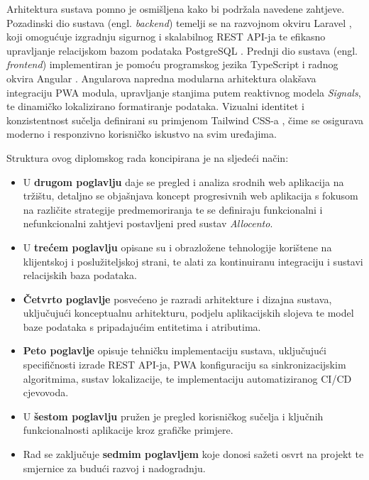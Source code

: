 \documentclass[a4paper,12pt,oneside]{article}
\begin{document}
	Arhitektura sustava pomno je osmišljena kako bi podržala navedene zahtjeve. Pozadinski dio sustava (engl. \textit{backend}) temelji se na razvojnom okviru Laravel \cite{w_laravel,b_php_mvc}, koji omogućuje izgradnju sigurnog i skalabilnog REST API-ja te efikasno upravljanje relacijskom bazom podataka PostgreSQL \cite{w_postgresql}. Prednji dio sustava (engl. \textit{frontend}) implementiran je pomoću programskog jezika TypeScript \cite{w_typescript} i radnog okvira Angular \cite{w_angular,b_html5}. Angularova napredna modularna arhitektura olakšava integraciju PWA modula, upravljanje stanjima putem reaktivnog modela \textit{Signals}, te dinamičko lokalizirano formatiranje podataka. Vizualni identitet i konzistentnost sučelja definirani su primjenom Tailwind CSS-a \cite{w_tailwind}, čime se osigurava moderno i responzivno korisničko iskustvo na svim uređajima.

	Struktura ovog diplomskog rada koncipirana je na sljedeći način:
	
	\begin{itemize}
		\item U \textbf{drugom poglavlju} daje se pregled i analiza srodnih web aplikacija na tržištu, detaljno se objašnjava koncept progresivnih web aplikacija s fokusom na različite strategije predmemoriranja te se definiraju funkcionalni i nefunkcionalni zahtjevi postavljeni pred sustav \textit{Allocento}.
		
		\item U \textbf{trećem poglavlju} opisane su i obrazložene tehnologije korištene na klijentskoj i poslužiteljskoj strani, te alati za kontinuiranu integraciju i sustavi relacijskih baza podataka.
		
		\item \textbf{Četvrto poglavlje} posvećeno je razradi arhitekture i dizajna sustava, uključujući konceptualnu arhitekturu, podjelu aplikacijskih slojeva te model baze podataka s pripadajućim entitetima i atributima.
		
		\item \textbf{Peto poglavlje} opisuje tehničku implementaciju sustava, uključujući specifičnosti izrade REST API-ja, PWA konfiguraciju sa sinkronizacijskim algoritmima, sustav lokalizacije, te implementaciju automatiziranog CI/CD cjevovoda.
		
		\item U \textbf{šestom poglavlju} pružen je pregled korisničkog sučelja i ključnih funkcionalnosti aplikacije kroz grafičke primjere.
		
		\item Rad se zaključuje \textbf{sedmim poglavljem} koje donosi sažeti osvrt na projekt te smjernice za budući razvoj i nadogradnju.
		
	\end{itemize}
	
\end{document}
